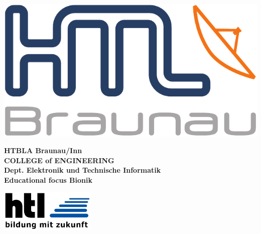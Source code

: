 \begin{minipage}[c]{0.20\linewidth}
\includegraphics[width=0.8\linewidth]{media/images/htl_c_cmyk_rein}
\end{minipage}
\begin{minipage}[c]{0.6\linewidth}
\begin{center}
{\bfseries\sffamily\large HTBLA Braunau/Inn\\
COLLEGE of ENGINEERING\\
Dept. Elektronik und Technische Informatik\\
{\normalsize Educational focus Bionik} }
\end{center}
\end{minipage}
\begin{minipage}[c]{0.2\linewidth}
\hfill \includegraphics[width=0.8\linewidth]{media/images/htl-bildung-mit-zukunft}
\end{minipage}\\

\vspace{1em}

